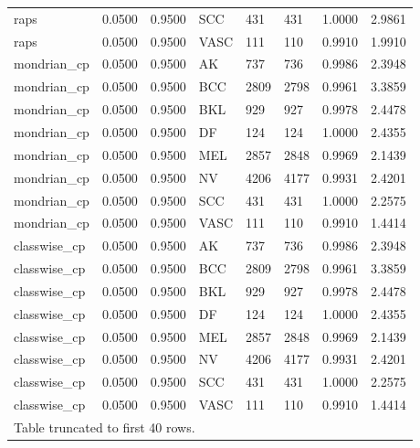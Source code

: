 \begin{table}[htbp]
\begin{tabular}{llllllll}
raps & 0.0500 & 0.9500 & SCC & 431 & 431 & 1.0000 & 2.9861 \\
raps & 0.0500 & 0.9500 & VASC & 111 & 110 & 0.9910 & 1.9910 \\
mondrian\_cp & 0.0500 & 0.9500 & AK & 737 & 736 & 0.9986 & 2.3948 \\
mondrian\_cp & 0.0500 & 0.9500 & BCC & 2809 & 2798 & 0.9961 & 3.3859 \\
mondrian\_cp & 0.0500 & 0.9500 & BKL & 929 & 927 & 0.9978 & 2.4478 \\
mondrian\_cp & 0.0500 & 0.9500 & DF & 124 & 124 & 1.0000 & 2.4355 \\
mondrian\_cp & 0.0500 & 0.9500 & MEL & 2857 & 2848 & 0.9969 & 2.1439 \\
mondrian\_cp & 0.0500 & 0.9500 & NV & 4206 & 4177 & 0.9931 & 2.4201 \\
mondrian\_cp & 0.0500 & 0.9500 & SCC & 431 & 431 & 1.0000 & 2.2575 \\
mondrian\_cp & 0.0500 & 0.9500 & VASC & 111 & 110 & 0.9910 & 1.4414 \\
classwise\_cp & 0.0500 & 0.9500 & AK & 737 & 736 & 0.9986 & 2.3948 \\
classwise\_cp & 0.0500 & 0.9500 & BCC & 2809 & 2798 & 0.9961 & 3.3859 \\
classwise\_cp & 0.0500 & 0.9500 & BKL & 929 & 927 & 0.9978 & 2.4478 \\
classwise\_cp & 0.0500 & 0.9500 & DF & 124 & 124 & 1.0000 & 2.4355 \\
classwise\_cp & 0.0500 & 0.9500 & MEL & 2857 & 2848 & 0.9969 & 2.1439 \\
classwise\_cp & 0.0500 & 0.9500 & NV & 4206 & 4177 & 0.9931 & 2.4201 \\
classwise\_cp & 0.0500 & 0.9500 & SCC & 431 & 431 & 1.0000 & 2.2575 \\
classwise\_cp & 0.0500 & 0.9500 & VASC & 111 & 110 & 0.9910 & 1.4414 \\
\multicolumn{8}{l}{Table truncated to first 40 rows.} \\
\hline
\end{tabular}
\end{table}

